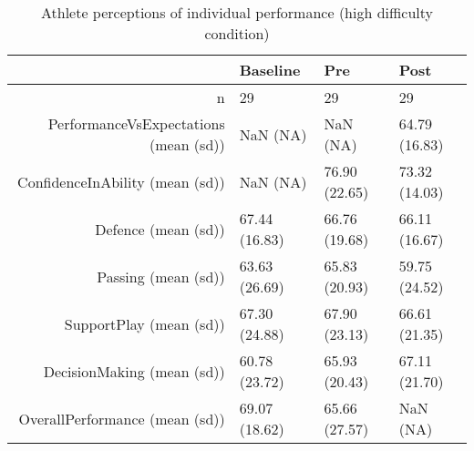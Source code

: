 \begin{table}[ht]
\centering
\begin{tabular}{rlll}
  \hline
 & Baseline & Pre & Post \\ 
  \hline
n &    29 &    29 &    29 \\ 
  PerformanceVsExpectations (mean (sd)) &   NaN (NA) &   NaN (NA) & 64.79 (16.83) \\ 
  ConfidenceInAbility (mean (sd)) &   NaN (NA) & 76.90 (22.65) & 73.32 (14.03) \\ 
  Defence (mean (sd)) & 67.44 (16.83) & 66.76 (19.68) & 66.11 (16.67) \\ 
  Passing (mean (sd)) & 63.63 (26.69) & 65.83 (20.93) & 59.75 (24.52) \\ 
  SupportPlay (mean (sd)) & 67.30 (24.88) & 67.90 (23.13) & 66.61 (21.35) \\ 
  DecisionMaking (mean (sd)) & 60.78 (23.72) & 65.93 (20.43) & 67.11 (21.70) \\ 
  OverallPerformance (mean (sd)) & 69.07 (18.62) & 65.66 (27.57) &   NaN (NA) \\ 
   \hline
\end{tabular}
\caption{Athlete perceptions of 
 individual performance (high difficulty condition)} 
\label{tab:indPerfTimeHighTraining}
\end{table}
